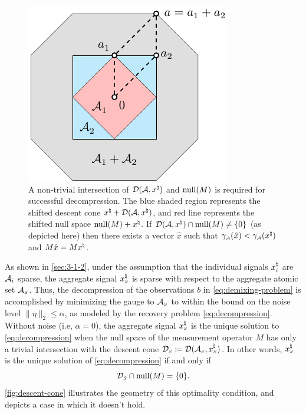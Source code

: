 \begin{figure}[t]
    \centering
   \includegraphics[page=7]{./figures/illustrations2} 
  \caption{A non-trivial intersection of $\mathcal{D}(\mathcal{A}, x^{\natural})$ and $\operatorname{null}(M)$ is required for successful decompression. The blue shaded region represents the shifted descent cone $x^{\natural} + \mathcal{D}(\mathcal{A}, x^{\natural})$, and red line represents the shifted null space $\operatorname{null}(M) + x^{\natural}$. If $\mathcal{D}(\mathcal{A}, x^{\natural}) \cap \operatorname{null}(M) \neq \{0\}$ (as depicted here) then there exists a vector $\hat x$ such that  $\gamma_{\scriptscriptstyle\mathcal{A}}(\hat x) < \gamma_{\scriptscriptstyle\mathcal{A}}(x^{\natural})$ and $M\hat x = Mx^{\natural}$.\label{fig:descent-cone}}
\end{figure}

As shown in \autoref{sec:3-1-2}, under the assumption that the individual signals $x_i^{\natural}$ are $\mathcal{A}_i$ sparse, the aggregate signal $x_{\scriptscriptstyle S}^\natural$ is sparse with respect to the aggregate atomic set $\mathcal{A}_{\scriptscriptstyle S}$.
Thus, the decompression of the observations $b$ in \eqref{eq:demixing-problem} is accomplished by minimizing the gauge to $\mathcal{A}_{\scriptscriptstyle S}$ to within the bound on the noise level $\|\eta\|_2\le\alpha$, as modeled by the recovery problem \eqref{eq:decompression}.
Without noise (i.e, $\alpha=0$), the aggregate signal $x_{\scriptscriptstyle S}^\natural$ is the unique solution to \eqref{eq:decompression} when the null space of the measurement operator $M$ has only a trivial intersection with the descent cone $\mathcal{D}_{\scriptscriptstyle S}\coloneqq\mathcal{D}(\mathcal{A}_{\scriptscriptstyle S}, x_{\scriptscriptstyle S}^\natural)$.
In other words, $x_{\scriptscriptstyle S}^\natural$ is the unique solution of \eqref{eq:decompression} if and only if 
\begin{equation}\label{eq-unique-optimality}
  \mathcal{D}_{\scriptscriptstyle S}\cap\operatorname{null}(M) = \{0\}.  
\end{equation}
\autoref{fig:descent-cone} illustrates the geometry of this optimality condition, and depicts a case in which it doesn't hold.

